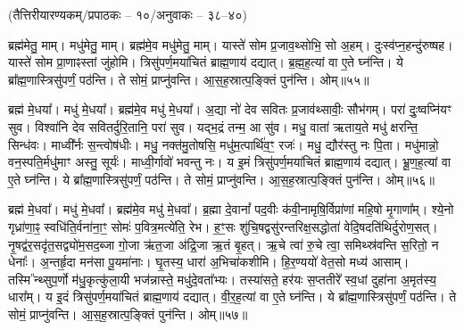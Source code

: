 

\vspace{-1ex}
\centerline{\normalsize (तैत्तिरीयारण्यकम्/प्रपाठकः – १०/अनुवाकः – ३८–४०)}
ब्रह्म॑मेतु॒ माम्। मधु॑मेतु॒ माम्। ब्रह्म॑मे॒व मधु॑मेतु॒ माम्। यास्ते॑ सोम प्र॒जाव॒थ्सोभि॒ सो अ॒हम्। दुःस्व॑प्न॒हन्दु॑रुष्षह। यास्ते॑ सोम प्रा॒णाꣴस्तां जु॑होमि। त्रिसु॑पर्ण॒मया॑चितं ब्राह्म॒णाय॑ दद्यात्। ब्र॒ह्म॒ह॒त्यां वा ए॒ते घ्न॑न्ति। ये ब्रा᳚ह्म॒णास्त्रिसु॑पर्णं॒ पठ॑न्ति। ते सोमं॒ प्राप्नु॑वन्ति। आ॒स॒ह॒स्रात्प॒ङ्क्तिं पुन॑न्ति। ओम्॥५५॥

ब्रह्म॑ मे॒धया᳚। मधु॑ मे॒धया᳚। ब्रह्म॑मे॒व मधु॑ मे॒धया᳚। अ॒द्या नो॑ देव सवितः प्र॒जाव॑थ्सावीः॒ सौभ॑गम्। परा॑ दुः॒ष्वप्नि॑यꣳ सुव। विश्वा॑नि देव सवितर्दुरि॒तानि॒ परा॑ सुव। यद्भ॒द्रं तन्म॒ आ सु॑व। मधु॒ वाता॑ ऋताय॒ते मधु॑ क्षरन्ति॒ सिन्ध॑वः। माध्वी᳚र्नः स॒न्त्वोष॑धीः। मधु॒ नक्त॑मु॒तोषसि॒ मधु॑म॒त्पार्थि॑व॒ꣳ॒ रजः॑। मधु॒ द्यौर॑स्तु नः पि॒ता। मधु॑मान्नो॒ वन॒स्पति॒र्मधु॑माꣳ अस्तु॒ सूर्यः॑। माध्वी॒र्गावो॑ भवन्तु नः। य इ॒मं त्रिसु॑पर्ण॒मया॑चितं ब्राह्म॒णाय॑ दद्यात्। भ्रू॒ण॒ह॒त्यां वा ए॒ते घ्न॑न्ति। ये ब्रा᳚ह्म॒णास्त्रिसु॑पर्णं॒ पठ॑न्ति। ते सोमं॒ प्राप्नु॑वन्ति। आ॒स॒ह॒स्रात्प॒ङ्क्तिं पुन॑न्ति। ओम्॥५६॥

ब्रह्म॑ मे॒धवा᳚। मधु॑ मे॒धवा᳚। ब्रह्म॑मे॒व मधु॑ मे॒धवा᳚। ब्र॒ह्मा दे॒वानां᳚ पद॒वीः क॑वी॒नामृषि॒र्विप्रा॑णां महि॒षो मृ॒गाणा᳚म्। श्ये॒नो गृध्रा॑णा॒ꣴ॒ स्वधि॑ति॒र्वना॑ना॒ꣳ॒ सोमः॑ प॒वित्र॒मत्ये॑ति॒ रेभ\sn{}। ह॒ꣳ॒सः शु॑चि॒षद्वसु॑रन्तरिक्ष॒सद्धोता॑ वेदि॒षदति॑थिर्दुरोण॒सत्। नृ॒षद्व॑र॒सदृ॑त॒सद्व्यो॑म॒सद॒ब्जा गो॒जा ऋ॑त॒जा अ॑द्रि॒जा ऋ॒तं बृ॒हत्। ऋ॒चे त्वा॑ रु॒चे त्वा॒ समिथ्स्र॑वन्ति स॒रितो॒ न धेनाः᳚। अ॒न्तर्\mbox{}हृ॒दा मन॑सा पू॒यमा॑नाः। घृ॒तस्य॒ धारा॑ अ॒भिचा॑कशीमि। हि॒र॒ण्ययो॑ वेत॒सो मध्य॑ आसाम्। \mbox{तस्मि ᳚\hspace{-1.25ex}न्थ्सु}\-प॒र्णो म॑धु॒कृत्कु॑ला॒यी भज॑न्नास्ते॒ मधु॑\-दे॒वता᳚भ्यः। तस्या॑सते॒ हर॑यः स॒प्ततीरे᳚ स्व॒धां दुहा॑ना अ॒मृत॑स्य॒ धारा᳚म्। य इ॒दं त्रिसु॑पर्ण॒मया॑चितं ब्राह्म॒णाय॑ दद्यात्। वी॒र॒ह॒त्यां वा ए॒ते घ्न॑न्ति। ये ब्रा᳚ह्म॒णास्त्रिसु॑पर्णं॒ पठ॑न्ति। ते सोमं॒ प्राप्नु॑वन्ति। आ॒स॒ह॒स्रात्प॒ङ्क्तिं पुन॑न्ति। ओम्॥५७॥

